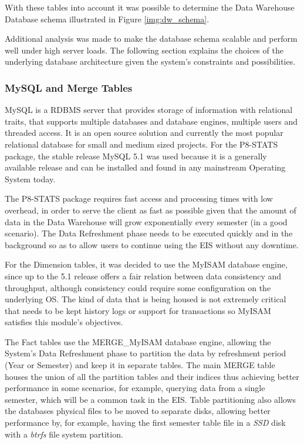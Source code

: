 
With these tables into account it was possible to determine the Data Warehouse
Database schema illustrated in Figure \ref{img:dw_schema}.

Additional analysis was made to make the database schema scalable and perform
well under high server loads. The following section explains the choices of
the underlying database architecture given the system's constraints and
possibilities.

\subsubsection{MySQL and Merge Tables}\label{ssec:mysql_merge}

MySQL is a RDBMS server that provides storage of information with relational
traits, that supports multiple databases and database engines, multiple users
and threaded access. It is an open source solution and currently the most
popular relational database for small and medium sized projects. For the
P8-STATS package, the stable release MySQL 5.1 was used because it is a
generally available release and can be installed and found in any mainstream
Operating System today.

The P8-STATS package requires fast access and processing times with low
overhead, in order to serve the client as fast as possible given that the amount
of data in the Data Warehouse will grow exponentially every semester (in a good
scenario). The Data Refreshment phase needs to be executed quickly and in the
background so as to allow users to continue using the EIS without any downtime.

For the Dimension tables, it was decided to use the MyISAM database engine,
since up to the 5.1 release offers a fair relation between data consistency and
throughput, although consistency could require some configuration on the
underlying OS. The kind of data that is being housed is not extremely critical
that needs to be kept history logs or support for transactions so MyISAM
satisfies this module's objectives.

The Fact tables use the MERGE\_MyISAM database engine, allowing the System's
Data Refreshment phase to partition the data by refreshment period (Year or
Semester) and keep it in separate tables. The main MERGE table houses the union
of all the partition tables and their indices thus achieving better performance
in some scenarios\cite{dw:mysql:boss}, for example, querying data from a single
semester, which will be a common task in the EIS. Table partitioning also allows
the databases physical files to be moved to separate disks, allowing better
performance by, for example, having the first semester table file in a
\emph{SSD} disk with a \emph{btrfs} file system partition.

